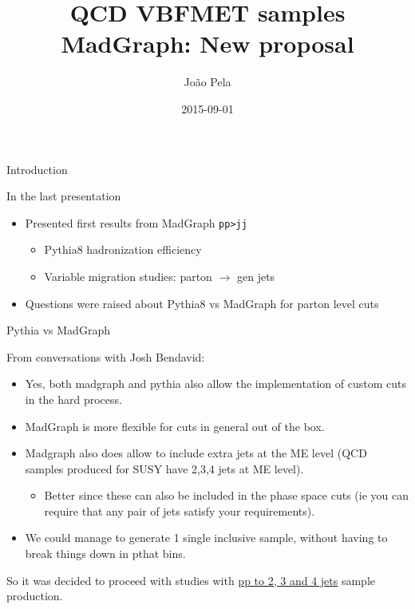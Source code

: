 \documentclass[8pt]{beamer}
\author[J. Pela]{João Pela}
\title{QCD VBFMET samples MadGraph: New proposal}
\institute[ICL]{Imperial College London}
\date{2015-09-01}
\begin{document}
\setlength{\unitlength}{1mm}

\begin{frame}
  \titlepage
\end{frame}

\begin{frame}{Introduction}

\begin{block}{In the last presentation}
  
\begin{itemize}
  \item Presented first results from MadGraph \texttt{pp>jj}
  \begin{itemize}
    \item Pythia8 hadronization efficiency
    \item Variable migration studies: parton $\rightarrow$ gen jets
  \end{itemize}
  \item Questions were raised about Pythia8 vs MadGraph for parton level cuts
\end{itemize}

\end{block}

\begin{block}{Pythia vs MadGraph}

From conversations with Josh Bendavid:

\begin{itemize}
  \item Yes, both madgraph and pythia also allow the implementation of custom cuts in the hard process.
  \item MadGraph is more flexible for cuts in general out of the box.
  \item Madgraph also does allow to include extra jets at the ME level (QCD samples produced for SUSY have 2,3,4 jets at ME level). 
  \begin{itemize}
    \item Better since these can also be included in the phase space cuts (ie you can require that any pair of jets satisfy your requirements).
  \end{itemize}
  \item We could manage to generate 1 single inclusive sample, without having to break things down in pthat bins.
\end{itemize}

\end{block}

\begin{center}
  So it was decided to proceed with studies with \uline{pp to 2, 3 and 4 jets} sample production.
\end{center}


\end{frame}
\end{document}

